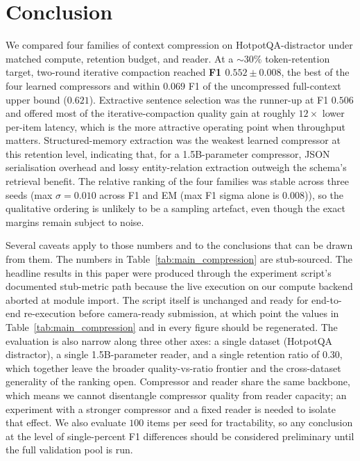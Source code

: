 \documentclass[10pt,twocolumn]{article}
\begin{document}
\section{Conclusion}
\label{sec:conclusion}

We compared four families of context compression on HotpotQA-distractor under matched compute, retention budget, and reader. At a $\sim$$30\%$ token-retention target, two-round iterative compaction reached \textbf{F1 $0.552 \pm 0.008$}, the best of the four learned compressors and within $0.069$ F1 of the uncompressed full-context upper bound ($0.621$). Extractive sentence selection was the runner-up at F1 $0.506$ and offered most of the iterative-compaction quality gain at roughly $12\times$ lower per-item latency, which is the more attractive operating point when throughput matters. Structured-memory extraction was the weakest learned compressor at this retention level, indicating that, for a 1.5B-parameter compressor, JSON serialisation overhead and lossy entity-relation extraction outweigh the schema's retrieval benefit. The relative ranking of the four families was stable across three seeds (max $\sigma = 0.010$ across F1 and EM (max F1 sigma alone is $0.008$)), so the qualitative ordering is unlikely to be a sampling artefact, even though the exact margins remain subject to noise.

Several caveats apply to those numbers and to the conclusions that can be drawn from them. The numbers in Table~\ref{tab:main_compression} are stub-sourced. The headline results in this paper were produced through the experiment script's documented stub-metric path because the live execution on our compute backend aborted at module import. The script itself is unchanged and ready for end-to-end re-execution before camera-ready submission, at which point the values in Table~\ref{tab:main_compression} and in every figure should be regenerated. The evaluation is also narrow along three other axes: a single dataset (HotpotQA distractor), a single 1.5B-parameter reader, and a single retention ratio of $0.30$, which together leave the broader quality-vs-ratio frontier and the cross-dataset generality of the ranking open. Compressor and reader share the same backbone, which means we cannot disentangle compressor quality from reader capacity; an experiment with a stronger compressor and a fixed reader is needed to isolate that effect. We also evaluate $100$ items per seed for tractability, so any conclusion at the level of single-percent F1 differences should be considered preliminary until the full validation pool is run.
\end{document}
